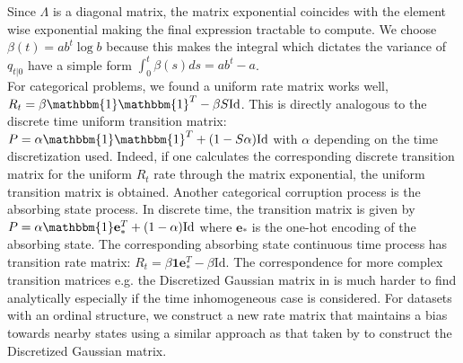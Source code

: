 \documentclass{article}
\begin{document}
Since $\Lambda$ is a diagonal matrix, the matrix exponential coincides with the element wise exponential making the final expression tractable to compute. We choose $\beta(t) = a b^t \log b$ because this makes the integral which dictates the variance of $q_{t|0}$ have a simple form $\int_0^t \beta(s) ds = a b^t - a$.\\

For categorical problems, we found a uniform rate matrix works well, $R_t = \beta \mathbbm{1} \mathbbm{1}^T - \beta S \mathrm{Id}$.
This is directly analogous to the discrete time uniform transition matrix: $P = \alpha \mathbbm{1}\mathbbm{1}^T + (1 - S \alpha) \mathrm{Id}$ with $\alpha$ depending on the time discretization used. Indeed, if one calculates the corresponding discrete transition matrix for the uniform $R_t$ rate through the matrix exponential, the uniform transition matrix is obtained. Another categorical corruption process is the absorbing state process. In discrete time, the transition matrix is given by $P = \alpha \mathbbm{1} \mathbf{e}_\ast^T + (1-\alpha) \mathrm{Id}$ where $\mathbf{e}_\ast$ is the one-hot encoding of the absorbing state. The corresponding absorbing state continuous time process has transition rate matrix: $R_t = \beta \mathbf{1} \mathbf{e}_\ast^T - \beta \mathrm{Id}$. The correspondence for more complex transition matrices e.g. the Discretized Gaussian matrix in \cite{austin2021structured} is much harder to find analytically especially if the time inhomogeneous case is considered. For datasets with an ordinal structure, we construct a new rate matrix that maintains a bias towards nearby states using a similar approach as that taken by \cite{austin2021structured} to construct the Discretized Gaussian matrix. 
\end{document}
